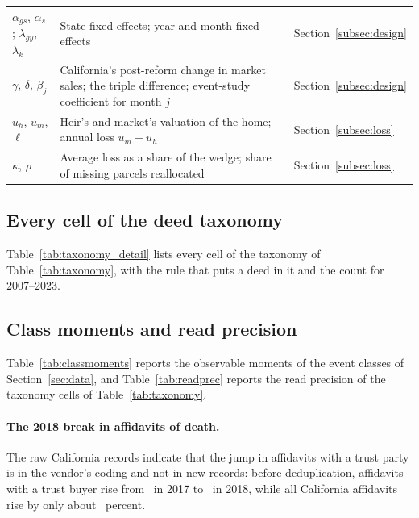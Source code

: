 \begin{table}[!ht]
{\begin{tabular}{p{3.6cm}p{8.6cm}p{2.6cm}}
$\alpha_{gs}$, $\alpha_s$; $\lambda_{gy}$, $\lambda_k$ & State fixed effects; year and month fixed effects & Section~\ref{subsec:design} \\
$\gamma$, $\delta$, $\beta_j$ & California's post-reform change in market sales; the triple difference; event-study coefficient for month $j$ & Section~\ref{subsec:design} \\
$u_h$, $u_m$, $\ell$ & Heir's and market's valuation of the home; annual loss $u_m-u_h$ & Section~\ref{subsec:loss} \\
$\kappa$, $\rho$ & Average loss as a share of the wedge; share of missing parcels reallocated & Section~\ref{subsec:loss} \\
\bottomrule\end{tabular}}
\end{table}

\subsection{Every cell of the deed taxonomy}\label{app:taxonomydetail}

Table~\ref{tab:taxonomy_detail} lists every cell of the taxonomy of Table~\ref{tab:taxonomy}, with the rule that puts a deed in it and the count for 2007--2023.



\subsection{Class moments and read precision}\label{app:readprec}

Table~\ref{tab:classmoments} reports the observable moments of the event classes of Section~\ref{sec:data}, and Table~\ref{tab:readprec} reports the read precision of the taxonomy cells of Table~\ref{tab:taxonomy}.





\paragraph{The 2018 break in affidavits of death.} The raw California records indicate that the jump in affidavits with a trust party is in the vendor's coding and not in new records: before deduplication, affidavits with a trust buyer rise from \SIVAffTrustBuyerTwentySeventeen\ in 2017 to \SIVAffTrustBuyerTwentyEighteen\ in 2018, while all California affidavits rise by only about \SIIIAfRawTotalGrowth\ percent.


